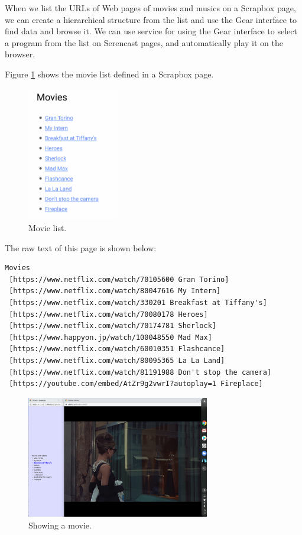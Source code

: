 \documentclass{article}
\def\SC{\textsf{\small Serencast}}
\def\SB{\textsf{\small Scrapbox}}
\begin{document}
When we list the URLs of Web pages of
movies and musics on a {\SB} page,
we can create a hierarchical structure from the list and
use the Gear interface to find data and browse it.
We can use  service
for using the Gear interface to select a program from the
list on {\SC} pages, and automatically play it on the browser.

Figure \ref{movielist} shows the movie list defined in a {\SB} page.

\begin{figure}[H]
\centerline{\includegraphics[width=40mm,bb=0 0 387 568]{figures/2b97930bf5730fcaf4d9c0adeb9c5f6e.png}}
\caption{Movie list.}
\label{movielist}
\end{figure}

The raw text of this page is shown below:

{\scriptsize
\begin{verbatim}
Movies
 [https://www.netflix.com/watch/70105600 Gran Torino]
 [https://www.netflix.com/watch/80047616 My Intern]
 [https://www.netflix.com/watch/330201 Breakfast at Tiffany's]
 [https://www.netflix.com/watch/70080178 Heroes]
 [https://www.netflix.com/watch/70174781 Sherlock]
 [https://www.happyon.jp/watch/100048550 Mad Max]
 [https://www.netflix.com/watch/60010351 Flashcance]
 [https://www.netflix.com/watch/80095365 La La Land]
 [https://www.netflix.com/watch/81191988 Don't stop the camera]
 [https://youtube.com/embed/AtZr9g2vwrI?autoplay=1 Fireplace]
\end{verbatim}}

\begin{figure}[H]
\centerline{\includegraphics[width=80mm,bb=0 0 2400 1600]{figures/e8ae562a5a68a1955ac70b4faed9a146.png}}
\caption{Showing a movie.}
\label{tiffany}
\end{figure}
\end{document}
